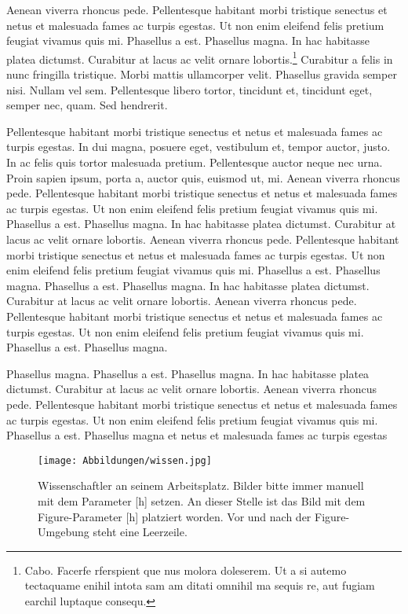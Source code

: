 Aenean viverra rhoncus pede. Pellentesque habitant morbi tristique senectus et netus et malesuada fames ac turpis egestas. Ut non enim eleifend felis pretium feugiat vivamus quis mi. Phasellus a est. Phasellus magna. In hac habitasse platea dictumst. Curabitur at lacus ac velit ornare lobortis.\footnote{Cabo. Facerfe rferspient que nus molora doleserem. Ut a si autemo tectaquame enihil intota sam am ditati omnihil ma sequis re, aut fugiam earchil luptaque consequ.} Curabitur a felis in nunc fringilla tristique. Morbi mattis ullamcorper velit. Phasellus gravida semper nisi. Nullam vel sem. Pellentesque libero tortor, tincidunt et, tincidunt eget, semper nec, quam. Sed hendrerit.

Pellentesque habitant morbi tristique senectus et netus et malesuada fames ac turpis egestas. In dui magna, posuere eget, vestibulum et, tempor auctor, justo. In ac felis quis tortor malesuada pretium. Pellentesque auctor neque nec urna. Proin sapien ipsum, porta a, auctor quis, euismod ut, mi. Aenean viverra rhoncus pede. Pellentesque habitant morbi tristique senectus et netus et malesuada fames ac turpis egestas. Ut non enim eleifend felis pretium feugiat vivamus quis mi. Phasellus a est. Phasellus magna. In hac habitasse platea dictumst. Curabitur at lacus ac velit ornare lobortis. Aenean viverra rhoncus pede. Pellentesque habitant morbi tristique senectus et netus et malesuada fames ac turpis egestas. Ut non enim eleifend felis pretium feugiat vivamus quis mi. Phasellus a est. Phasellus magna. Phasellus a est. Phasellus magna. In hac habitasse platea dictumst. Curabitur at lacus ac velit ornare lobortis. Aenean viverra rhoncus pede. Pellentesque habitant morbi tristique senectus et netus et malesuada fames ac turpis egestas. Ut non enim eleifend felis pretium feugiat vivamus quis mi. Phasellus a est. Phasellus magna.

Phasellus magna. Phasellus a est. Phasellus magna. In hac habitasse platea dictumst. Curabitur at lacus ac velit ornare lobortis. Aenean viverra rhoncus pede. Pellentesque habitant morbi tristique senectus et netus et malesuada fames ac turpis egestas. Ut non enim eleifend felis pretium feugiat vivamus quis mi. Phasellus a est. Phasellus magna et netus et malesuada fames ac turpis egestas

\begin{figure}[h]
	\centering
	\texttt{[image: Abbildungen/wissen.jpg]}
	\caption[Wissenschaftler an seinem Arbeitsplatz.]{Wissenschaftler an seinem Arbeitsplatz. Bilder bitte immer manuell mit dem Parameter [h] setzen. An dieser Stelle ist das Bild mit dem Figure-Parameter [h] platziert worden. Vor und nach der Figure-Umgebung steht eine Leerzeile.}
	\label{fig:wissen}
\end{figure}

